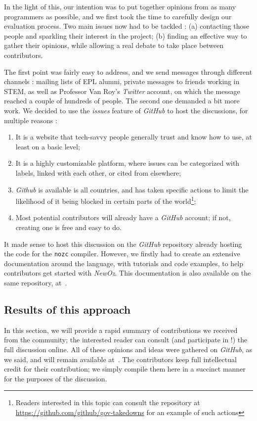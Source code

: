 In the light of this, our intention was to put together opinions from as many programmers as possible, and we first took the time to carefully design our evaluation process.
Two main issues now had to be tackled : (a) contacting those people and sparkling their interest in the project; (b) finding an effective way to gather their opinions, while allowing a real debate to take place between contributors.\newline

The first point was fairly easy to address, and we send messages through different channels : mailing lists of EPL alumni, private messages to friends working in STEM, as well as Professor Van Roy's \textit{Twitter} account, on which the message reached a couple of hundreds of people.\newline
The second one demanded a bit more work.
We decided to use the \textit{issues} feature of \textit{GitHub} to host the discussions, for multiple reasons :
\begin{enumerate}
    \item It is a website that tech-savvy people generally trust and know how to use, at least on a basic level;
    \item It is a highly customizable platform, where issues can be categorized with labels, linked with each other, or cited from elsewhere;
    \item \textit{Github} is available is all countries, and has taken specific actions to limit the likelihood of it being blocked in certain parts of the world\footnote{Readers interested in this topic can consult the repository at \url{https://github.com/github/gov-takedowns} for an example of such actions};
    \item Most potential contributors will already have a \textit{GitHub} account;
    if not, creating one is free and easy to do.
\end{enumerate}
It made sense to host this discussion on the \textit{GitHub} repository already hosting the code for the \texttt{nozc} compiler.
However, we firstly had to create an extensive documentation around the language, with tutorials and code examples, to help contributors get started with \textit{NewOz}.
This documentation is also available on the same repository, at~\cite{NozcGitHub}.

\subsection{Results of this approach}
In this section, we will provide a rapid summary of contributions we received from the community;
the interested reader can consult (and participate in !) the full discussion online.
All of these opinions and ideas were gathered on \textit{GitHub}, as we said, and will remain available at~\cite{NozcGitHub}.
The contributors keep full intellectual credit for their contribution;
we simply compile them here in a succinct manner for the purposes of the discussion.\newline

